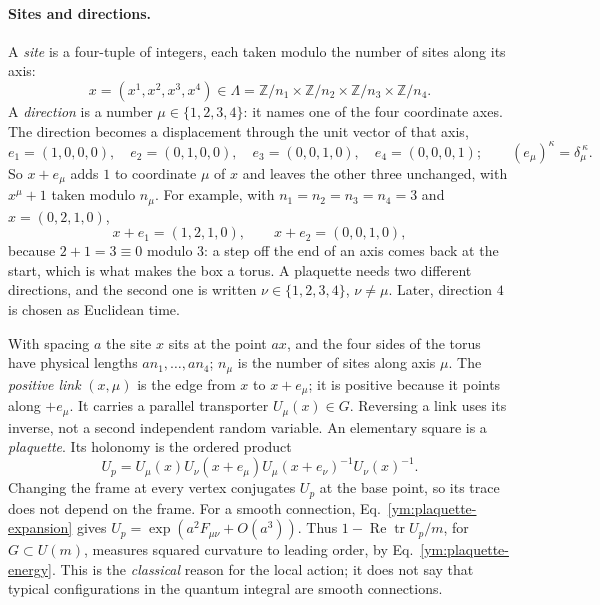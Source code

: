 \paragraph{Sites and directions.}
A \emph{site} is a four-tuple of integers, each taken modulo the number of
sites along its axis:
\begin{equation}\label{ym:guide-sites}
 x=(x^1,x^2,x^3,x^4)\in\Lambda
 =\mathbb Z/n_1\times\mathbb Z/n_2\times\mathbb Z/n_3\times\mathbb Z/n_4 .
\end{equation}
A \emph{direction} is a number $\mu\in\{1,2,3,4\}$: it names one of the
four coordinate axes. The direction becomes a displacement through the unit
vector of that axis,
\begin{equation}\label{ym:guide-unit-vectors}
 e_1=(1,0,0,0),\quad e_2=(0,1,0,0),\quad e_3=(0,0,1,0),\quad
 e_4=(0,0,0,1);\qquad (e_\mu)^\kappa=\delta_\mu^{\ \kappa}.
\end{equation}
So $x+e_\mu$ adds $1$ to coordinate $\mu$ of $x$ and leaves the other three
unchanged, with $x^\mu+1$ taken modulo $n_\mu$. For example, with
$n_1=n_2=n_3=n_4=3$ and $x=(0,2,1,0)$,
\begin{equation}\label{ym:guide-step-example}
 x+e_1=(1,2,1,0),\qquad x+e_2=(0,0,1,0),
\end{equation}
because $2+1=3\equiv0$ modulo $3$: a step off the end of an axis comes back
at the start, which is what makes the box a torus. A plaquette needs two
different directions, and the second one is written $\nu\in\{1,2,3,4\}$,
$\nu\ne\mu$. Later, direction $4$ is chosen as Euclidean time.

With spacing $a$ the site $x$ sits at the point $ax$, and the four sides of
the torus have physical lengths $an_1,\dots,an_4$; $n_\mu$ is the number of
sites along axis $\mu$. The \emph{positive link} $(x,\mu)$ is the edge from
$x$ to $x+e_\mu$; it is positive because it points along $+e_\mu$. It
carries a parallel transporter $U_\mu(x)\in G$. Reversing a link uses its
inverse, not a second independent random variable. An elementary square is
a \emph{plaquette}. Its holonomy is the ordered product
\begin{equation}\label{ym:guide-holonomy}
 U_p=U_\mu(x)U_\nu(x+e_\mu)
 U_\mu(x+e_\nu)^{-1}U_\nu(x)^{-1}.
\end{equation}
Changing the frame at every vertex conjugates $U_p$ at the base point, so its
trace does not depend on the frame. For a smooth connection,
Eq.~\eqref{ym:plaquette-expansion} gives $U_p=\exp(a^2F_{\mu\nu}+O(a^3))$.
Thus $1-\operatorname{Re}\operatorname{tr} U_p/m$, for $G\subset U(m)$,
measures squared curvature to leading order, by Eq.~\eqref{ym:plaquette-energy}.
This is the \emph{classical} reason for the local action; it does not say
that typical configurations in the quantum integral are smooth connections.

